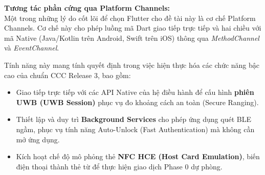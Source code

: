 \textbf{Tương tác phần cứng qua Platform Channels:} \\
Một trong những lý do cốt lõi để chọn Flutter cho đề tài này là cơ chế Platform Channels. Cơ chế này cho phép luồng mã Dart giao tiếp trực tiếp và hai chiều với mã Native (Java/Kotlin trên Android, Swift trên iOS) thông qua \textit{MethodChannel} và \textit{EventChannel}. 

Tính năng này mang tính quyết định trong việc hiện thực hóa các chức năng bậc cao của chuẩn CCC Release 3, bao gồm:
\begin{itemize}
    \item Giao tiếp trực tiếp với các API Native của hệ điều hành để cấu hình \textbf{phiên UWB (UWB Session)} phục vụ đo khoảng cách an toàn (Secure Ranging).
    \item Thiết lập và duy trì \textbf{Background Services} cho phép ứng dụng quét BLE ngầm, phục vụ tính năng Auto-Unlock (Fast Authentication) mà không cần mở ứng dụng.
    \item Kích hoạt chế độ mô phỏng thẻ \textbf{NFC HCE (Host Card Emulation)}, biến điện thoại thành thẻ từ để thực hiện giao dịch Phase 0 dự phòng.
\end{itemize}

